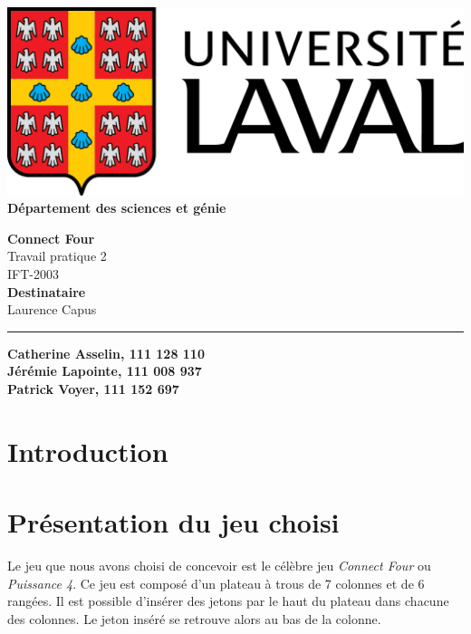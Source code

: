 \documentclass[12pt]{article}
\begin{document}
\begin{titlepage}
	\begin{minipage}{0.5\textwidth}
		\begin{flushleft}
			\includegraphics[scale=0.1]{logo.png} \\
			\textbf{Département des sciences et génie}
		\end{flushleft}
	\end{minipage}
	\vspace{150px}
	\begin{center} \large
		\textbf{Connect Four} \\
		Travail pratique 2 \\
		IFT-2003 \\
		\vspace{150px}
		\textbf{Destinataire} \\
		Laurence Capus
	\end{center}
	\vfill
	\rule{\linewidth}{.5pt}
	\newline
	\textbf{Catherine Asselin, 111 128 110} \\
	\textbf{Jérémie Lapointe, 111 008 937} \\
	\textbf{Patrick Voyer, 111 152 697}
\end{titlepage}

\newpage
\setcounter{page}{1}

\section*{Introduction}

\section*{Présentation du jeu choisi}
Le jeu que nous avons choisi de concevoir est le célèbre jeu \textit{Connect Four} ou \textit{Puissance 4}. Ce jeu est composé d'un plateau à trous de 7 colonnes et de 6 rangées. Il est possible d'insérer des jetons par le haut du plateau dans chacune des colonnes. Le jeton inséré se retrouve alors au bas de la colonne. \\
\end{document}
